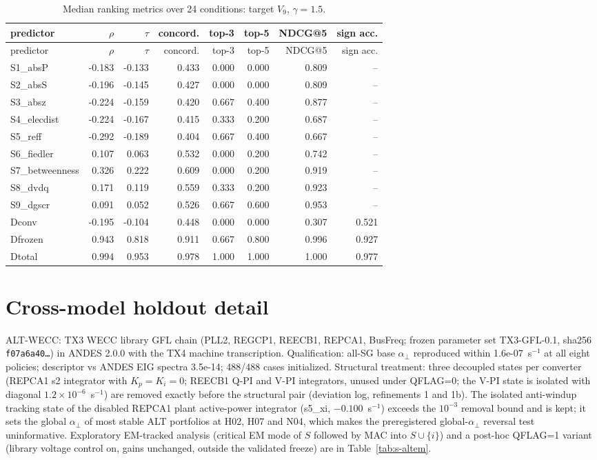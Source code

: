 \documentclass[10pt,a4paper]{article}
\newcommand{\aperp}{\alpha_{\perp}}
\begin{document}
{\scriptsize
\begin{longtable}{lrrrrrrr}
\caption{Median ranking metrics over 24 conditions: target $V_9$, $\gamma=1.5$.}\label{tab:s-bl-V9-1.5-FULL}\\
\toprule
predictor & $\rho$ & $\tau$ & concord. & top-3 & top-5 & NDCG@5 & sign acc. \\
\midrule
\endfirsthead
\toprule
predictor & $\rho$ & $\tau$ & concord. & top-3 & top-5 & NDCG@5 & sign acc. \\
\midrule
\endhead
S1\_absP & -0.183 & -0.133 & 0.433 & 0.000 & 0.000 & 0.809 & -- \\
S2\_absS & -0.196 & -0.145 & 0.427 & 0.000 & 0.000 & 0.809 & -- \\
S3\_absz & -0.224 & -0.159 & 0.420 & 0.667 & 0.400 & 0.877 & -- \\
S4\_elecdist & -0.224 & -0.167 & 0.415 & 0.333 & 0.200 & 0.687 & -- \\
S5\_reff & -0.292 & -0.189 & 0.404 & 0.667 & 0.400 & 0.667 & -- \\
S6\_fiedler & 0.107 & 0.063 & 0.532 & 0.000 & 0.200 & 0.742 & -- \\
S7\_betweenness & 0.326 & 0.222 & 0.609 & 0.000 & 0.200 & 0.919 & -- \\
S8\_dvdq & 0.171 & 0.119 & 0.559 & 0.333 & 0.200 & 0.923 & -- \\
S9\_dgscr & 0.091 & 0.052 & 0.526 & 0.667 & 0.600 & 0.953 & -- \\
Dconv & -0.195 & -0.104 & 0.448 & 0.000 & 0.000 & 0.307 & 0.521 \\
Dfrozen & 0.943 & 0.818 & 0.911 & 0.667 & 0.800 & 0.996 & 0.927 \\
Dtotal & 0.994 & 0.953 & 0.978 & 1.000 & 1.000 & 1.000 & 0.977 \\
\bottomrule
\end{longtable}}


\section{Cross-model holdout detail}
ALT-WECC: TX3 WECC library GFL chain (PLL2, REGCP1, REECB1, REPCA1, BusFreq; frozen parameter set TX3-GFL-0.1, sha256 \texttt{f07a6a40\ldots}) in ANDES 2.0.0 with the TX4 machine transcription. Qualification: all-SG base $\aperp$ reproduced within 1.6e-07~s$^{-1}$ at all eight policies; descriptor vs ANDES EIG spectra 3.5e-14; 488/488 cases initialized. Structural treatment: three decoupled states per converter (REPCA1 s2 integrator with $K_p=K_i=0$; REECB1 Q-PI and V-PI integrators, unused under QFLAG=0; the V-PI state is isolated with diagonal $1.2\times10^{-6}$~s$^{-1}$) are removed exactly before the structural pair (deviation log, refinements 1 and 1b). The isolated anti-windup tracking state of the disabled REPCA1 plant active-power integrator (s5\_xi, $-0.100$~s$^{-1}$) exceeds the $10^{-3}$ removal bound and is kept; it sets the global $\aperp$ of most stable ALT portfolios at H02, H07 and N04, which makes the preregistered global-$\aperp$ reversal test uninformative. Exploratory EM-tracked analysis (critical EM mode of $S$ followed by MAC into $S\cup\{i\}$) and a post-hoc QFLAG=1 variant (library voltage control on, gains unchanged, outside the validated freeze) are in Table~\ref{tab:s-altem}.
\end{document}

